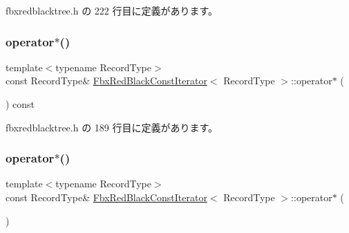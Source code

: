  fbxredblacktree.\+h の 222 行目に定義があります。

\mbox{\label{class_fbx_red_black_const_iterator_a05c5d03970d6df3d9df410a71ed6ca7b}} 
\subsubsection{\texorpdfstring{operator$\ast$()}{operator*()}\hspace{0.1cm}{\footnotesize\ttfamily [1/2]}}
{\footnotesize\ttfamily template$<$typename Record\+Type$>$ \\
const Record\+Type\& \hyperlink{class_fbx_red_black_const_iterator}{Fbx\+Red\+Black\+Const\+Iterator}$<$ Record\+Type $>$\+::operator$\ast$ (\begin{DoxyParamCaption}{ }\end{DoxyParamCaption}) const\hspace{0.3cm}{\ttfamily [inline]}}



 fbxredblacktree.\+h の 189 行目に定義があります。

\mbox{\label{class_fbx_red_black_const_iterator_aeb755cf6e44025b6ea8544e4b59588a6}} 
\subsubsection{\texorpdfstring{operator$\ast$()}{operator*()}\hspace{0.1cm}{\footnotesize\ttfamily [2/2]}}
{\footnotesize\ttfamily template$<$typename Record\+Type$>$ \\
const Record\+Type\& \hyperlink{class_fbx_red_black_const_iterator}{Fbx\+Red\+Black\+Const\+Iterator}$<$ Record\+Type $>$\+::operator$\ast$ (\begin{DoxyParamCaption}{ }\end{DoxyParamCaption})\hspace{0.3cm}{\ttfamily [inline]}}



